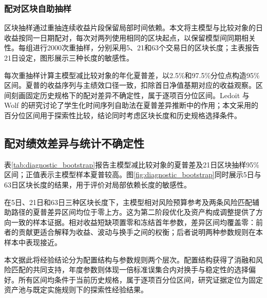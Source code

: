 \subsubsection{配对区块自助抽样}
区块抽样通过重抽连续收益片段保留局部时间依赖\cite{kunsch1989bootstrap}。本文将主模型与比较对象的日收益按同一日期配对，每次对两列使用相同的区块起点，以保留模型间同期相关性。每组进行2000次重抽样，分别采用5、21和63个交易日的区块长度；主表报告21日设定，图形展示三种长度的敏感性。

每次重抽样计算主模型减比较对象的年化夏普差，以2.5\%和97.5\%分位点构造95\%区间。夏普的收益序列与主绩效口径一致，扣除首日净值基期对应的收益观察。区间刻画固定历史规格下的配对差异不确定性，属于逐项百分位区间。Ledoit 与 Wolf 的研究讨论了学生化时间序列自助法在夏普差异推断中的作用\cite{ledoit2008sharpe}；本文采用的百分位区间用于探索性比较，结论同时考虑区块长度和历史规格选择条件。
\subsection{配对绩效差异与统计不确定性}
表\ref{tab:diagnostic_bootstrap}报告主模型减比较对象的夏普差及21日区块抽样95\%区间；正值表示主模型样本夏普较高。图\ref{fig:diagnostic_bootstrap}同时展示5日与63日区块长度的结果，用于评价对局部依赖长度的敏感性。

\begin{table}[htbp]\centering
\caption{配对夏普差异的区块抽样区间}\label{tab:diagnostic_bootstrap}
\fitthesistable{}
\end{table}

\FloatBarrier

在5日、21日和63日三种区块长度下，主模型相对风险预算参考及两条风险匹配辅助路径的夏普差异区间均位于零上方。这为第二阶段优化及资产构成调整提供了方向一致的样本证据。相对收益短缺项置零和冻结首年参数，差异区间均覆盖零：前者的贡献更适合解释为收益、波动与换手之间的权衡；后者说明两种参数规则在本样本中表现接近。

本文据此将经验结论分为配置结构与参数规则两个层次。配置结构获得了消融和风险匹配的共同支持，年度参数则体现一倍标准误集合内对换手与稳定性的选择偏好。所有区间均条件于当前历史规格，属于逐项百分位区间，研究证据定位为固定资产池与既定实施规则下的探索性经验结果。
\FloatBarrier


